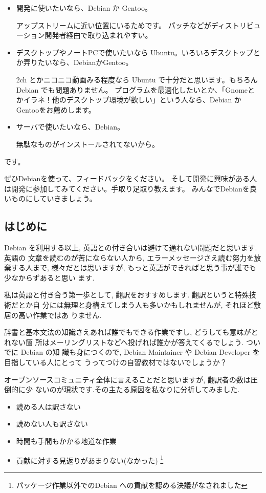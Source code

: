 \documentclass[mingoth,a4paper]{jsarticle}
\begin{document}
\begin{itemize}
\item 開発に使いたいなら、Debian か Gentoo。

アップストリームに近い位置にいるためです。
パッチなどがディストリビューション開発者経由で取り込まれやすい。

\item デスクトップやノートPCで使いたいなら Ubuntu。いろいろデスクトップとか弄りたいなら、DebianかGentoo。

2ch とかニコニコ動画みる程度なら Ubuntu で十分だと思います。もちろん Debian でも問題ありません。
プログラムを最適化したいとか、「Gnomeとかイラネ！他のデスクトップ環境が欲しい」という人なら、Debian かGentooをお薦めします。

\item サーバで使いたいなら、Debian。

無駄なものがインストールされてないから。

\end{itemize}
です。

ぜひDebianを使って、フィードバックをください。
そして開発に興味がある人は開発に参加してみてください。手取り足取り教えます。
みんなでDebianを良いものにしていきましょう。

\subsection{はじめに}
Debian を利用する以上, 英語との付き合いは避けて通れない問題だと思います. 英語の
文章を読むのが苦にならない人から, エラーメッセージさえ読む努力を放棄する人まで,
様々だとは思いますが, もっと英語ができればと思う事が誰でも少なからずあると思い
ます.

私は英語と付き合う第一歩として, 翻訳をおすすめします. 翻訳というと特殊技術だとか自
分には無理と身構えてしまう人も多いかもしれませんが, それほど敷居の高い作業ではあ
りません.

辞書と基本文法の知識さえあれば誰でもできる作業ですし, どうしても意味がとれない箇
所はメーリングリストなどへ投げれば誰かが答えてくるでしょう. ついでに Debian の知
識も身につくので, Debian Maintainer や Debian Developer を目指している人にとって
うってつけの自習教材ではないでしょうか？

オープンソースコミュニティ全体に言えることだと思いますが, 翻訳者の数は圧倒的に少
ないのが現状です.その主たる原因を私なりに分析してみました.
\begin{itemize}
	\item 読める人は訳さない
	\item 読めない人も訳さない
	\item 時間も手間もかかる地道な作業
	\item 貢献に対する見返りがあまりない(なかった)
	\footnote{パッケージ作業以外でのDebian への貢献を認める決議がなされました}
\end{itemize}
\end{document}
